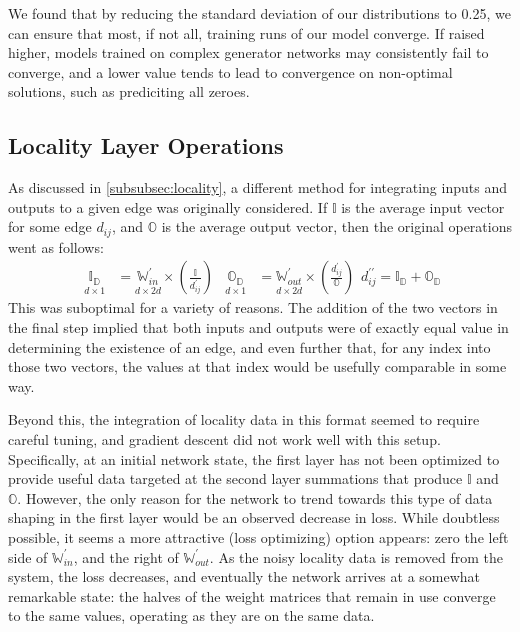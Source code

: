 We found that by reducing the standard deviation of our distributions to 0.25, 
we can ensure that most, if not all, training runs of our model converge. If 
raised higher, models trained on complex generator networks may consistently 
fail to converge, and a lower value tends to lead to convergence on non-optimal 
solutions, such as prediciting all zeroes. 

\subsection{Locality Layer Operations}
\label{subsec:localops}
As discussed in \ref{subsubsec:locality}, a different method for integrating 
inputs and outputs to a given edge was originally considered. If $\mathbb{I}$ is 
the average input vector for some edge $d_{ij}$, and $\mathbb{O}$ is the average 
output vector, then the original operations went as follows:
\begin{subequations}
\begin{align}
	\underset{d \times 1}{\mathbb{I_D}} &= \underset{d \times 
	2d}{\mathbb{W}_{in}^\prime} \times 
	\left(\frac{\mathbb{I}}{d_{ij}^\prime}\right) &
	\underset{d \times 1}{\mathbb{O_D}} &= \underset{d \times 
		2d}{\mathbb{W}_{out}^\prime} \times 
		\left(\frac{d_{ij}^\prime}{\mathbb{O}}\right)
\end{align}
\begin{equation}
		d_{ij}^{\prime\prime} = \mathbb{I_D} + \mathbb{O_D}
\end{equation}
\end{subequations}
This was suboptimal for a variety of reasons. The addition of the two vectors in 
the final step implied that both inputs and outputs were of exactly equal value 
in determining the existence of an edge, and even further that, for any index 
into those two vectors, the values at that index would be usefully comparable in 
some way.

Beyond this, the integration of locality data in this format seemed to require 
careful tuning, and gradient descent did not work well with this setup.  
Specifically, at an initial network state, the first layer has not been 
optimized to provide useful data targeted at the second layer summations that 
produce $\mathbb{I}$ and $\mathbb{O}$. However, the only reason for the network 
to trend towards this type of data shaping in the first layer would be an 
observed decrease in loss. While doubtless possible, it seems a more attractive 
(loss optimizing) option appears: zero the left side of 
$\mathbb{W}_{in}^\prime$, and the right of $\mathbb{W}_{out}^\prime$. As the 
noisy locality data is removed from the system, the loss decreases, and 
eventually the network arrives at a somewhat remarkable state: the halves of the 
weight matrices that remain in use converge to the same values, operating as 
they are on the same data.

